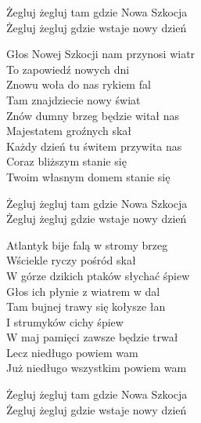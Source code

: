 \begin{text}

    \vin Żegluj żegluj tam gdzie Nowa Szkocja\\
    \vin Żegluj żegluj gdzie wstaje nowy dzień
	
    Głos Nowej Szkocji nam przynosi wiatr\\
    To zapowiedź nowych dni\\
    Znowu woła do nas rykiem fal\\
    Tam znajdziecie nowy świat\\
    Znów dumny brzeg będzie witał nas\\
    Majestatem groźnych skał\\
    Każdy dzień tu świtem przywita nas\\
    Coraz bliższym stanie się\\
    Twoim własnym domem stanie się
	
	\vin Żegluj żegluj tam gdzie Nowa Szkocja\\
    \vin Żegluj żegluj gdzie wstaje nowy dzień

    Atlantyk bije falą w stromy brzeg\\
    Wściekle ryczy pośród skał\\
    W górze dzikich ptaków słychać śpiew\\
    Głos ich płynie z wiatrem w dal\\
    Tam bujnej trawy się kołysze łan\\
    I strumyków cichy śpiew\\
    W maj pamięci zawsze będzie trwał\\
    Lecz niedługo powiem wam\\
    Już niedługo wszystkim powiem wam
	
	\vin Żegluj żegluj tam gdzie Nowa Szkocja\\
    \vin Żegluj żegluj gdzie wstaje nowy dzień

\end{text}
